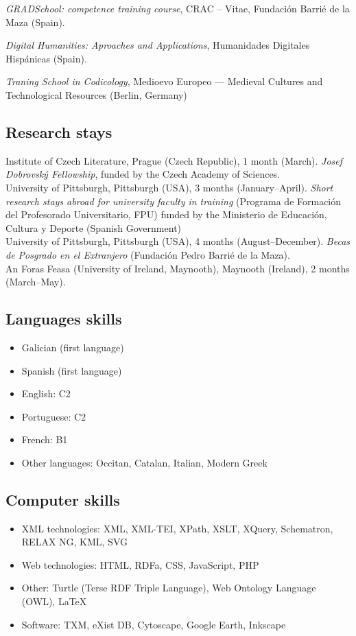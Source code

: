\documentclass[11pt, a4paper]{article}
\newcommand{\years}[1]{\marginnote{\scriptsize #1}}
\begin{document}
\years{2013}\textit{GRADSchool: competence training course}, CRAC – Vitae,  Fundación Barrié de la Maza (Spain).

\years{2013}\textit{Digital Humanities: Aproaches and Applications}, Humanidades Digitales Hispánicas (Spain).

\years{2013}\textit{Traning School in Codicology}, Medioevo Europeo — Medieval Cultures and Technological Resources (Berlin, Germany)

\subsection{Research stays}
 \years{2019} Institute of Czech Literature, Prague (Czech Republic), 1 month (March). \textit{Josef Dobrovský Fellowship}, funded by the Czech Academy of Sciences. \\
\years{2016} University of Pittsburgh, Pittsburgh (USA), 3 months (January--April). \textit{Short research stays abroad for university faculty in training} (Programa de Formación del Profesorado Universitario, FPU) funded by the Ministerio de Educación, Cultura y Deporte (Spanish Government)\\
\years{2014} University of Pittsburgh, Pittsburgh (USA), 4 months (August--December). \textit{Becas de Posgrado en el Extranjero} (Fundación Pedro Barrié de la Maza). \\
\years{2014} An Foras Feasa (University of Ireland, Maynooth), Maynooth (Ireland), 2 months (March--May).

\subsection{Languages skills}
\begin{itemize}[noitemsep]
 \item Galician (first language)
 \item Spanish (first language)
 \item English: C2
 \item Portuguese: C2
 \item French: B1
 \item Other languages: Occitan, Catalan, Italian, Modern Greek
\end{itemize}


\subsection{Computer skills}
\begin{itemize}[noitemsep]
 \item XML technologies: XML, XML-TEI, XPath, XSLT, XQuery, Schematron, RELAX NG, KML, SVG
 \item Web technologies: HTML, RDFa, CSS, JavaScript, PHP
 \item Other: Turtle (Terse RDF Triple Language), Web Ontology Language (OWL), LaTeX
 \item Software: TXM, eXist DB, Cytoscape, Google Earth, Inkscape 
\end{itemize}
\end{document}
